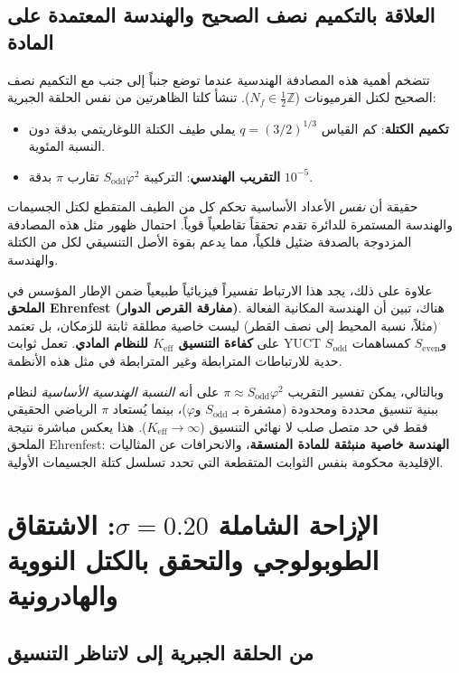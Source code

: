 \documentclass[12pt,a4paper]{article}
\begin{document}
	\subsection{العلاقة بالتكميم نصف الصحيح والهندسة المعتمدة على المادة}
	
	تتضخم أهمية هذه المصادفة الهندسية عندما توضع جنباً إلى جنب مع التكميم نصف الصحيح لكتل الفرميونات (\(N_f \in \frac{1}{2}\mathbb{Z}\)). تنشأ كلتا الظاهرتين من نفس الحلقة الجبرية:
	\begin{itemize}
		\item \textbf{تكميم الكتلة}: كم القياس \(q = (3/2)^{1/3}\) يملي طيف الكتلة اللوغاريتمي بدقة دون النسبة المئوية.
		\item \textbf{التقريب الهندسي}: التركيبة \(S_{\mathrm{odd}}\varphi^2\) تقارب \(\pi\) بدقة \(10^{-5}\).
	\end{itemize}
	حقيقة أن \emph{نفس} الأعداد الأساسية تحكم كل من الطيف المتقطع لكتل الجسيمات والهندسة المستمرة للدائرة تقدم تحققاً تقاطعياً قوياً. احتمال ظهور مثل هذه المصادفة المزدوجة بالصدفة ضئيل فلكياً، مما يدعم بقوة الأصل التنسيقي لكل من الكتلة والهندسة.
	
	علاوة على ذلك، يجد هذا الارتباط تفسيراً فيزيائياً طبيعياً ضمن الإطار المؤسس في \textbf{الملحق Ehrenfest (مفارقة القرص الدوار)}. هناك، تبين أن الهندسة المكانية الفعالة (مثلاً، نسبة المحيط إلى نصف القطر) ليست خاصية مطلقة ثابتة للزمكان، بل تعتمد على \textbf{كفاءة التنسيق \(K_{\mathrm{eff}}\) للنظام المادي}. تعمل ثوابت YUCT \(S_{\mathrm{odd}}\) و\(S_{\mathrm{even}}\) كمساهمات حدية للارتباطات المترابطة وغير المترابطة في مثل هذه الأنظمة.
	
	وبالتالي، يمكن تفسير التقريب \(\pi \approx S_{\mathrm{odd}}\varphi^2\) على أنه \emph{النسبة الهندسية الأساسية} لنظام ببنية تنسيق محددة ومحدودة (مشفرة بـ \(S_{\mathrm{odd}}\) و\(\varphi\))، بينما يُستعاد \(\pi\) الرياضي الحقيقي فقط في حد متصل صلب لا نهائي التنسيق (\(K_{\mathrm{eff}} \to \infty\)). هذا يعكس مباشرة نتيجة الملحق Ehrenfest: \textbf{الهندسة خاصية منبثقة للمادة المنسقة}، والانحرافات عن المثاليات الإقليدية محكومة بنفس الثوابت المتقطعة التي تحدد تسلسل كتلة الجسيمات الأولية.
	
	\section{الإزاحة الشاملة \(\sigma = 0.20\): الاشتقاق الطوبولوجي والتحقق بالكتل النووية والهادرونية}
	\label{sec:sigma}
	
	\subsection{من الحلقة الجبرية إلى لاتناظر التنسيق}
	
\end{document}
